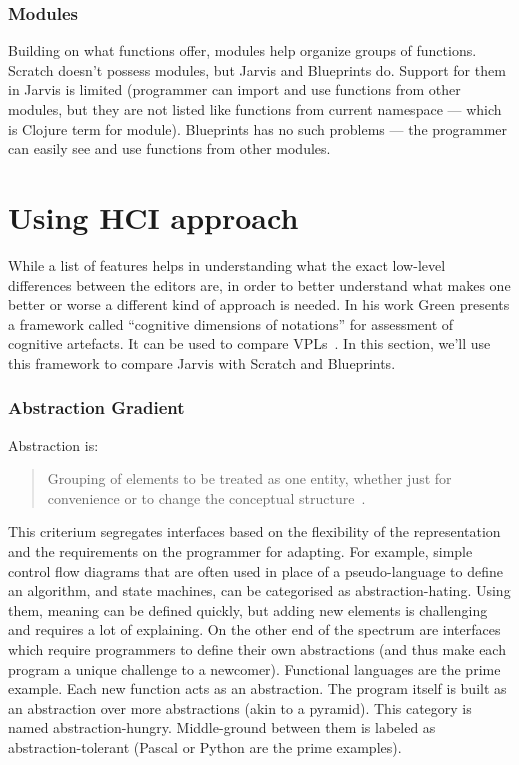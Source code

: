 \documentclass[english,mgr,shortabstract]{iithesis}
\begin{document}
\subsubsection*{Modules}
Building on what functions offer, modules help organize groups of functions.
Scratch doesn't possess modules, but Jarvis and Blueprints do. Support for them
in Jarvis is limited (programmer can import and use functions from other
modules, but they are not listed like functions from current namespace --- which
is Clojure term for module).
Blueprints has no such problems --- the programmer can easily see and use functions
from other modules.

\section{Using HCI approach}
While a list of features helps in understanding what the exact low-level
differences between the editors are, in order to better understand what makes one
better or worse a different kind of approach is needed.
In his work Green presents a framework called “cognitive dimensions
of notations” for assessment of cognitive artefacts.
It can be used to compare VPLs~\cite{Green96UsabilityAnalysis}. In this section,
we’ll use this framework to compare Jarvis with Scratch and Blueprints.

\subsubsection*{Abstraction Gradient}
Abstraction is:
\blockquote{Grouping of elements to be
  treated as one entity, whether just for convenience or to change the
  conceptual structure~\cite{Green96UsabilityAnalysis}.}
This criterium segregates interfaces based on the flexibility of the
representation and the requirements on the programmer for adapting.
For example, simple control flow diagrams that are often used in place of a
pseudo-language to define an algorithm, and state machines, can be categorised
as abstraction-hating.
Using them, meaning can be defined quickly, but adding new elements is
challenging and requires a lot of explaining.
On the other end of the spectrum are interfaces which require programmers to
define their own abstractions (and thus make each program a unique challenge to
a newcomer).
Functional languages are the prime example.
Each new function acts as an abstraction.
The program itself is built as an abstraction over more abstractions (akin to a
pyramid).
This category is named abstraction-hungry.
Middle-ground between them is labeled as abstraction-tolerant (Pascal or Python
are the prime examples).
\end{document}
